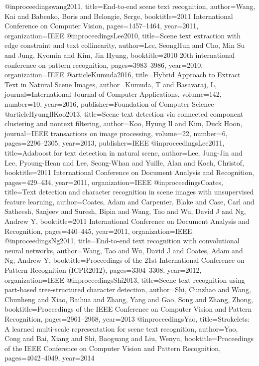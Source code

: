 @inproceedings{wang2011,
  title={End-to-end scene text recognition},
  author={Wang, Kai and Babenko, Boris and Belongie, Serge},
  booktitle={2011 International Conference on Computer Vision},
  pages={1457--1464},
  year={2011},
  organization={IEEE}
}
@inproceedings{Lee2010,
  title={Scene text extraction with edge constraint and text collinearity},
  author={Lee, SeongHun and Cho, Min Su and Jung, Kyomin and Kim, Jin Hyung},
  booktitle={2010 20th international conference on pattern recognition},
  pages={3983--3986},
  year={2010},
  organization={IEEE}
}
@article{Kumuda2016,
  title={Hybrid Approach to Extract Text in Natural Scene Images},
  author={Kumuda, T and Basavaraj, L},
  journal={International Journal of Computer Applications},
  volume={142},
  number={10},
  year={2016},
  publisher={Foundation of Computer Science}
}
@article{HyungIlKoo2013,
  title={Scene text detection via connected component clustering and nontext filtering},
  author={Koo, Hyung Il and Kim, Duck Hoon},
  journal={IEEE transactions on image processing},
  volume={22},
  number={6},
  pages={2296--2305},
  year={2013},
  publisher={IEEE}
}
@inproceedings{Lee2011,
  title={Adaboost for text detection in natural scene},
  author={Lee, Jung-Jin and Lee, Pyoung-Hean and Lee, Seong-Whan and Yuille, Alan and Koch, Christof},
  booktitle={2011 International Conference on Document Analysis and Recognition},
  pages={429--434},
  year={2011},
  organization={IEEE}
}
@inproceedings{Coates,
  title={Text detection and character recognition in scene images with unsupervised feature learning},
  author={Coates, Adam and Carpenter, Blake and Case, Carl and Satheesh, Sanjeev and Suresh, Bipin and Wang, Tao and Wu, David J and Ng, Andrew Y},
  booktitle={2011 International Conference on Document Analysis and Recognition},
  pages={440--445},
  year={2011},
  organization={IEEE}
}
@inproceedings{Ng2011,
  title={End-to-end text recognition with convolutional neural networks},
  author={Wang, Tao and Wu, David J and Coates, Adam and Ng, Andrew Y},
  booktitle={Proceedings of the 21st International Conference on Pattern Recognition (ICPR2012)},
  pages={3304--3308},
  year={2012},
  organization={IEEE}
}
@inproceedings{Shi2013,
  title={Scene text recognition using part-based tree-structured character detection},
  author={Shi, Cunzhao and Wang, Chunheng and Xiao, Baihua and Zhang, Yang and Gao, Song and Zhang, Zhong},
  booktitle={Proceedings of the IEEE Conference on Computer Vision and Pattern Recognition},
  pages={2961--2968},
  year={2013}
}
@inproceedings{Yao,
  title={Strokelets: A learned multi-scale representation for scene text recognition},
  author={Yao, Cong and Bai, Xiang and Shi, Baoguang and Liu, Wenyu},
  booktitle={Proceedings of the IEEE Conference on Computer Vision and Pattern Recognition},
  pages={4042--4049},
  year={2014}
}

